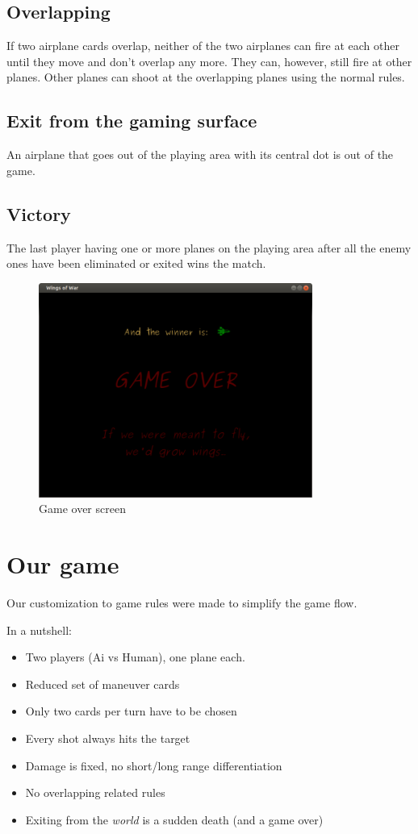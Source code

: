 \subsection{Overlapping}
If two airplane cards overlap, neither of the two airplanes can fire at each other until they move and don’t overlap any more. They can, however, still fire at other planes. Other planes can shoot at the overlapping planes using the normal rules.
\subsection{Exit from the gaming surface}
An airplane that goes out of the playing area with its central dot is out of the game.
\subsection{Victory}
The last player having one or more planes on the playing area after all the enemy ones have been eliminated or exited wins the match.
\begin{figure}
  \centering
      \includegraphics[width=0.8\textwidth]{images/5.png}
  \caption{Game over screen}
\end{figure}
\section{Our game}
\label{modify this name} 
Our customization to game rules were made to simplify the game flow.

In a nutshell:
\begin{itemize}
    \item Two players (Ai vs Human), one plane each.
    \item Reduced set of maneuver cards
    \item Only two cards per turn have to be chosen
    \item Every shot always hits the target
    \item Damage is fixed, no short/long range differentiation
    \item No overlapping related rules
    \item Exiting from the \textit{world} is a sudden death (and a game over)           
\end{itemize}

